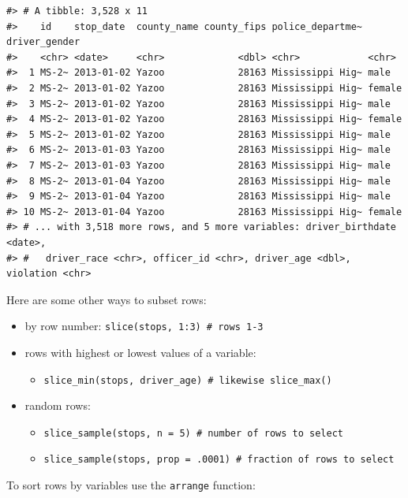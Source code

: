 \documentclass[
]{book}
\providecommand{\tightlist}{%
  \setlength{\itemsep}{0pt}\setlength{\parskip}{0pt}}
\begin{document}
\begin{verbatim}
#> # A tibble: 3,528 x 11
#>    id    stop_date  county_name county_fips police_departme~ driver_gender
#>    <chr> <date>     <chr>             <dbl> <chr>            <chr>        
#>  1 MS-2~ 2013-01-02 Yazoo             28163 Mississippi Hig~ male         
#>  2 MS-2~ 2013-01-02 Yazoo             28163 Mississippi Hig~ female       
#>  3 MS-2~ 2013-01-02 Yazoo             28163 Mississippi Hig~ male         
#>  4 MS-2~ 2013-01-02 Yazoo             28163 Mississippi Hig~ female       
#>  5 MS-2~ 2013-01-02 Yazoo             28163 Mississippi Hig~ male         
#>  6 MS-2~ 2013-01-03 Yazoo             28163 Mississippi Hig~ male         
#>  7 MS-2~ 2013-01-03 Yazoo             28163 Mississippi Hig~ male         
#>  8 MS-2~ 2013-01-04 Yazoo             28163 Mississippi Hig~ male         
#>  9 MS-2~ 2013-01-04 Yazoo             28163 Mississippi Hig~ male         
#> 10 MS-2~ 2013-01-04 Yazoo             28163 Mississippi Hig~ female       
#> # ... with 3,518 more rows, and 5 more variables: driver_birthdate <date>,
#> #   driver_race <chr>, officer_id <chr>, driver_age <dbl>, violation <chr>
\end{verbatim}

Here are some other ways to subset rows:

\begin{itemize}
\tightlist
\item
  by row number: \texttt{slice(stops,\ 1:3)\ \#\ rows\ 1-3}
\item
  rows with highest or lowest values of a variable:

  \begin{itemize}
  \tightlist
  \item
    \texttt{slice\_min(stops,\ driver\_age)\ \#\ likewise\ slice\_max()}
  \end{itemize}
\item
  random rows:

  \begin{itemize}
  \tightlist
  \item
    \texttt{slice\_sample(stops,\ n\ =\ 5)\ \#\ number\ of\ rows\ to\ select}
  \item
    \texttt{slice\_sample(stops,\ prop\ =\ .0001)\ \#\ fraction\ of\ rows\ to\ select}
  \end{itemize}
\end{itemize}

To sort rows by variables use the \texttt{arrange} function:
\end{document}
